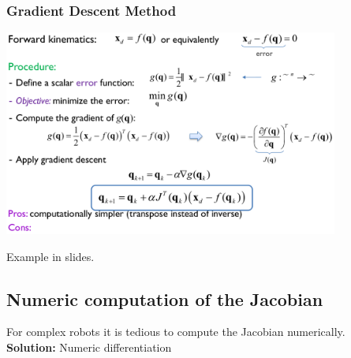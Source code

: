 \subsubsection{Gradient Descent Method}
\begin{center}
	\includegraphics[width=11cm]{sections/imgs/23.png}
\end{center}
Example in slides.

\subsection{Numeric computation of the Jacobian}
For complex robots it is tedious to compute the Jacobian numerically.\\
\textbf{Solution:} Numeric differentiation

